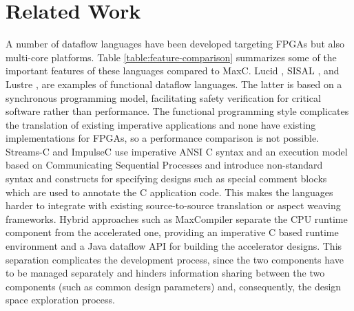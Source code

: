 \section{Related Work}

A number of dataflow languages have been developed targeting FPGAs but
also multi-core platforms. Table \ref{table:feature-comparison}
summarizes some of the important features of these languages compared
to MaxC. Lucid \cite{ashcroft1977lucid}, SISAL
\cite{gurd1987implicit}, \cite{mcgraw1983sisal} and Lustre
\cite{halbwachs1991synchronous}, are examples of functional dataflow
languages. The latter is based on a synchronous programming model,
facilitating safety verification for critical software
\cite{halbwachs1992programming} rather than performance. The
functional programming style complicates the translation of existing
imperative applications and none have existing implementations for
FPGAs, so a performance comparison is not possible.
Streams-C\cite{Gokhale:Stone:Arnold:Kalinowski:2000} and
ImpulseC\cite{ImpulseC} use imperative ANSI C syntax and an execution
model based on Communicating Sequential Processes and introduce
non-standard syntax and constructs for specifying designs such as
special comment blocks which are used to annotate the C application
code. This makes the languages harder to integrate with existing
source-to-source translation or aspect weaving frameworks. Hybrid
approaches such as MaxCompiler \cite{MaxelerTechnologies:2012}
separate the CPU runtime component from the accelerated one, providing
an imperative C based runtime environment and a Java dataflow API for
building the accelerator designs. This separation complicates the
development process, since the two components have to be managed
separately and hinders information sharing between the two components
(such as common design parameters) and, consequently, the design space
exploration process.


